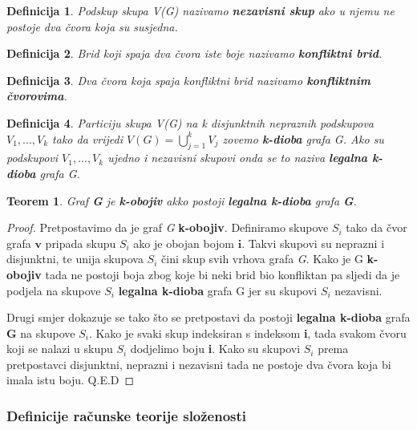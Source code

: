 \documentclass[times, utf8, diplomski, numeric]{fer}
\newtheorem{definition}{Definicija}
\newtheorem{theorem}{Teorem}
\begin{document}
\begin{definition}
Podskup skupa V(G) nazivamo \textbf{nezavisni skup} ako u njemu ne postoje dva čvora koja su susjedna.  
\end{definition}

\begin{definition}
Brid koji spaja dva čvora iste boje nazivamo \textbf{konfliktni brid}.
\end{definition}

\begin{definition}
Dva čvora koja spaja konfliktni brid nazivamo \textbf{konfliktnim čvorovima}.
\end{definition}

\begin{definition}
Particiju skupa V(G) na k disjunktnih nepraznih podskupova $V_1,..., V_k$
 tako da vrijedi $V(G) = \bigcup_{j=1}^{k}V_j$ zovemo \textbf{k-dioba} grafa G. Ako su podskupovi  $V_1 ,..., V_k$  ujedno i nezavisni skupovi onda se to naziva \textbf{legalna k-dioba} grafa G.
\end{definition}

\begin{theorem}
\label{thm:dioba}
Graf \textbf{G} je \textbf{k-obojiv} akko postoji \textbf{legalna k-dioba} grafa \textbf{G}.
\end{theorem}

\begin{proof}
Pretpostavimo da je graf \emph{G} \textbf{k-obojiv}. Definiramo skupove $S_i$ tako da čvor grafa $\mathbf{v}$ pripada skupu $S_i$ ako je obojan bojom $\mathbf{i}$. Takvi skupovi su neprazni i disjunktni, te unija skupova $S_i$ čini skup svih vrhova grafa \emph{G}. Kako je G \textbf{k-obojiv} tada ne postoji boja zbog koje bi neki brid bio konfliktan pa sljedi da je podjela na skupove $S_i$ \textbf{legalna k-dioba} grafa G jer su skupovi $S_i$ nezavisni. 

Drugi smjer dokazuje se tako što se pretpostavi da postoji \textbf{legalna k-dioba} grafa \textbf{G} na skupove $S_i$. Kako je svaki skup indeksiran s indeksom \textbf{i}, tada svakom čvoru koji se nalazi u skupu $S_i$ dodjelimo boju \textbf{i}. Kako su skupovi $S_i$ prema pretpostavci disjunktni, neprazni i nezavisni tada ne postoje dva čvora koja bi imala istu boju. Q.E.D
\end{proof}

\subsubsection{Definicije računske teorije složenosti}
\end{document}
